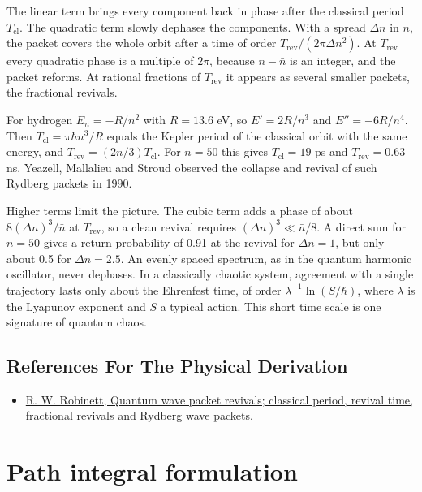 \documentclass[11pt,oneside]{book}
\begin{document}
The linear term brings every component back in phase after the classical period \(T_{\mathrm{cl}}\). The quadratic term slowly dephases the components. With a spread \(\Delta n\) in \(n\), the packet covers the whole orbit after a time of order \(T_{\mathrm{rev}}/(2\pi\Delta n^2)\). At \(T_{\mathrm{rev}}\) every quadratic phase is a multiple of \(2\pi\), because \(n-\bar n\) is an integer, and the packet reforms. At rational fractions of \(T_{\mathrm{rev}}\) it appears as several smaller packets, the fractional revivals.

For hydrogen \(E_n=-R/n^2\) with \(R=13.6\) eV, so \(E'=2R/n^3\) and \(E''=-6R/n^4\). Then \(T_{\mathrm{cl}}=\pi\hbar n^3/R\) equals the Kepler period of the classical orbit with the same energy, and \(T_{\mathrm{rev}}=(2\bar n/3)T_{\mathrm{cl}}\). For \(\bar n=50\) this gives \(T_{\mathrm{cl}}=19\) ps and \(T_{\mathrm{rev}}=0.63\) ns. Yeazell, Mallalieu and Stroud observed the collapse and revival of such Rydberg packets in 1990.

Higher terms limit the picture. The cubic term adds a phase of about \(8(\Delta n)^3/\bar n\) at \(T_{\mathrm{rev}}\), so a clean revival requires \((\Delta n)^3\ll\bar n/8\). A direct sum for \(\bar n=50\) gives a return probability of 0.91 at the revival for \(\Delta n=1\), but only about 0.5 for \(\Delta n=2.5\). An evenly spaced spectrum, as in the quantum harmonic oscillator, never dephases. In a classically chaotic system, agreement with a single trajectory lasts only about the Ehrenfest time, of order \(\lambda^{-1}\ln(S/\hbar)\), where \(\lambda\) is the Lyapunov exponent and \(S\) a typical action. This short time scale is one signature of quantum chaos.

\subsection*{References For The Physical Derivation}
\begin{itemize}
\item \href{https://arxiv.org/abs/quant-ph/0401031}{R. W. Robinett, Quantum wave packet revivals; classical period, revival time, fractional revivals and Rydberg wave packets.}
\end{itemize}





\clearpage

\section{Path integral formulation}
\end{document}
